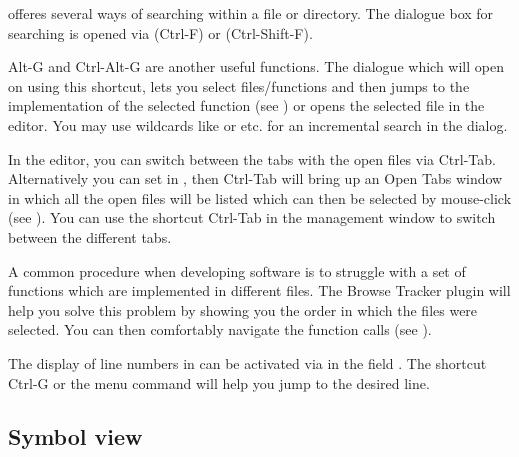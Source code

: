 
\codeblocks offeres several ways of searching within a file or directory. The dialogue box for searching is opened via  (Ctrl-F) or  (Ctrl-Shift-F).

Alt-G and Ctrl-Alt-G are another useful functions. The dialogue which will open on using this shortcut, lets you select files/functions and then jumps to the implementation of the selected function (see ) or opens the selected file in the editor. You may use wildcards like \codeline{*} or  etc. for an incremental search in the dialog.



In the editor, you can switch between the tabs with the open files via Ctrl-Tab. Alternatively you can set  in , then Ctrl-Tab will bring up an Open Tabs window in which all the open files will be listed which can then be selected by mouse-click (see ). You can use the shortcut Ctrl-Tab in the management window to switch between the different tabs.


A common procedure when developing software is to struggle with a set of functions which are implemented in different files. The Browse Tracker plugin will help you solve this problem by showing you the order in which the files were selected. You can then comfortably navigate the function calls (see ).

The display of line numbers in \codeblocks can be activated via  in the field . The shortcut Ctrl-G or the menu command  will help you jump to the desired line.


\subsection{Symbol view}

